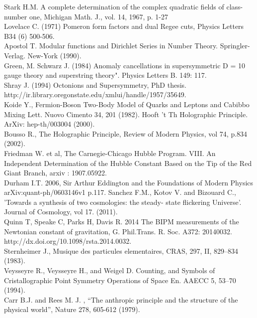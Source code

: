 \documentclass[a4paper,9pt]{article}
\begin{document}
\begin{thebibliography}{99}
 Stark H.M. A complete determination of the complex quadratic fields of class-number one, Michigan Math. J., vol. 14,‎ 1967, p. 1-27  \\
 Lovelace C. (1971) Pomeron form factors and dual Regee cuts, Physics Letters B34 (6) 500-506.\\
 Apostol T. Modular functions and Dirichlet Series in Number Theory. Springler-Verlag. New-York (1990).\\
 Green, M. Schwarz J. (1984)  Anomaly cancellations in supersymmetric D = 10 gauge theory and superstring theory". Physics Letters B. 149: 117.\\
 Shray J. (1994) Octonions and Supersymmetry, PhD thesis.  http://ir.library.oregonstate.edu/xmlui/handle/1957/35649. \\
 Koide Y., Fermion-Boson Two-Body Model of Quarks and Leptons and Cabibbo Mixing  Lett. Nuovo Cimento 34, 201 (1982). 
 Hooft 't Th Holographic Principle. ArXiv: hep-th/003004 (2000). \\
 Bousso R., The Holographic Principle, Review of Modern Physics, vol 74, p.834 (2002).\\
 Friedman W. et al, The Carnegie-Chicago Hubble Program. VIII. An Independent Determination of the Hubble Constant Based on the Tip of the Red Giant Branch, arxiv : 1907.05922.\\ 
 Durham I.T. 2006, Sir Arthur Eddington and the Foundations of Modern Physics arXiv:quant-ph/0603146v1  p.117.
 Sanchez F.M., Kotov V. and Bizouard C., 'Towards a synthesis of two cosmologies: the steady- state flickering Universe'. Journal of Cosmology, vol 17. (2011).\\
 Quinn T, Speake C, Parks H, Davis R. 2014 The BIPM measurements of the Newtonian constant of gravitation, G. Phil.Trans. R. Soc. A372: 20140032. http://dx.doi.org/10.1098/rsta.2014.0032. \\
 Sternheimer J., Musique des particules elementaires, CRAS, 297, II, 829--834 (1983).\\
 Veysseyre R., Veysseyre H., and Weigel D. Counting, and Symbols of Cristallographic Point Symmetry Operations of Space En. AAECC 5, 53--70 (1994).\\
 Carr B.J. and Rees M. J. , “The anthropic principle and the structure of the physical world”, Nature 278, 605-612 (1979).\\

\end{thebibliography}
\end{document}
